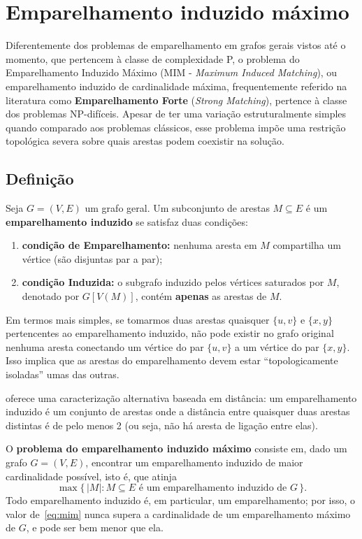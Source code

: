 \section{Emparelhamento induzido máximo}

Diferentemente dos problemas de emparelhamento em grafos gerais vistos até o momento, que pertencem à classe de complexidade P, o problema do Emparelhamento Induzido Máximo (MIM - \textit{Maximum Induced Matching}), ou emparelhamento induzido de cardinalidade máxima, frequentemente referido na literatura como \textbf{Emparelhamento Forte} (\textit{Strong Matching}), pertence à classe dos problemas NP-difíceis. Apesar de ter uma variação estruturalmente simples quando comparado aos problemas clássicos, esse problema impõe uma restrição topológica severa sobre quais arestas podem coexistir na solução.

\subsection{Definição}\label{sec:mim_def}

Seja $G = (V, E)$ um grafo geral. Um subconjunto de arestas $M \subseteq E$ é um \textbf{emparelhamento induzido} se satisfaz duas condições:

\begin{enumerate}
    \item \textbf{condição de Emparelhamento:} nenhuma aresta em $M$ compartilha um vértice (são disjuntas par a par);
    \item \textbf{condição Induzida:} o subgrafo induzido pelos vértices saturados por $M$, denotado por $G[V(M)]$, contém \textbf{apenas} as arestas de $M$.
\end{enumerate}

Em termos mais simples, se tomarmos duas arestas quaisquer $\{u, v\}$ e $\{x, y\}$ pertencentes ao emparelhamento induzido, não pode existir no grafo original nenhuma aresta conectando um vértice do par $\{u, v\}$ a um vértice do par $\{x, y\}$. Isso implica que as arestas do emparelhamento devem estar ``topologicamente isoladas'' umas das outras.

 oferece uma caracterização alternativa baseada em distância: um emparelhamento induzido é um conjunto de arestas onde a distância entre quaisquer duas arestas distintas é de pelo menos 2 (ou seja, não há aresta de ligação entre elas).

O \textbf{problema do emparelhamento induzido máximo} consiste em, dado um grafo $G = (V, E)$, encontrar um emparelhamento induzido de maior cardinalidade possível, isto é, que atinja
\begin{equation}
    \max \{\, |M| : M \subseteq E \text{ é um emparelhamento induzido de } G \,\}.
    \label{eq:mim}
\end{equation}
Todo emparelhamento induzido é, em particular, um emparelhamento; por isso, o valor de~\eqref{eq:mim} nunca supera a cardinalidade de um emparelhamento máximo de $G$, e pode ser bem menor que ela.

